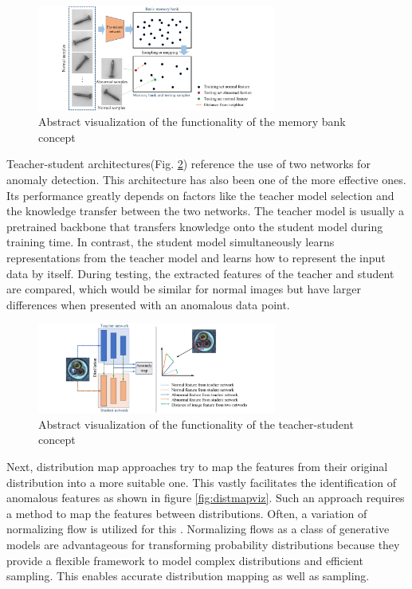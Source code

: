 \begin{figure}[H]
\centering
\includegraphics[width=0.7\textwidth]{figures/approachvizgeneral/memorybankviz.jpg}
\caption{Abstract visualization of the functionality of the memory bank concept \cite{liu2024deep}}
\label{fig:memorybankviz}
\end{figure}


Teacher-student architectures(Fig. \ref{fig:TSviz}) \cite{revdist2023} \cite{RudWeh2023AST} reference the use of two networks for anomaly detection. 
This architecture has also been one of the more effective ones. Its performance greatly depends on factors like the teacher model selection and the knowledge transfer between the two networks. The teacher model is usually a pretrained 
backbone that transfers knowledge onto the student model during training time. In contrast, the student model simultaneously learns representations from the teacher model and learns 
how to represent the input data by itself. During testing, the extracted features of the teacher and student are compared, which would be similar for normal images but have larger differences 
when presented with an anomalous data point.\newline


\begin{figure}[H]
\centering
\includegraphics[width=0.7\textwidth]{figures/approachvizgeneral/TSviz.jpg}
\caption{Abstract visualization of the functionality of the teacher-student concept \cite{liu2024deep}}
\label{fig:TSviz}
\end{figure}



Next, distribution map approaches \cite{csflow2022} try to map the features from their original distribution into a more suitable one. This vastly facilitates the identification of anomalous features as shown in 
figure \ref{fig:distmapviz}. Such an approach requires a method to map the features between distributions. Often, a variation of normalizing flow is utilized for this \cite{liu2024deep}. 
Normalizing flows as a class of generative models \cite{Kobyzev_2021normalizingflowexplanation} are advantageous for transforming probability distributions because they provide a flexible 
framework to model complex distributions and efficient sampling. This enables accurate distribution mapping as well as sampling. \newline


